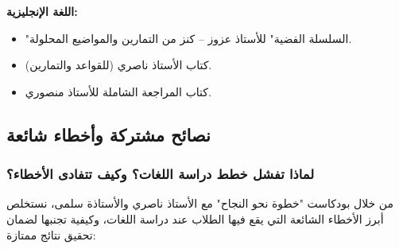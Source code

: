 \documentclass[12pt,a4paper]{book}
\begin{document}
	\textbf{اللغة الإنجليزية:}
	\begin{itemize}
		\item "السلسلة الفضية" للأستاذ عزوز – كنز من التمارين والمواضيع المحلولة.
		\item كتاب الأستاذ ناصري (للقواعد والتمارين).
		\item كتاب المراجعة الشاملة للأستاذ منصوري.
	\end{itemize}
	
	
	
	\subsection{نصائح مشتركة وأخطاء شائعة}
	\label{sec:random-tips11}
	
	\subsubsection{لماذا تفشل خطط دراسة اللغات؟ وكيف تتفادى الأخطاء؟}
	
	من خلال بودكاست "خطوة نحو النجاح" مع الأستاذ ناصري والأستاذة سلمى، نستخلص أبرز الأخطاء الشائعة التي يقع فيها الطلاب عند دراسة اللغات، وكيفية تجنبها لضمان تحقيق نتائج ممتازة:
	
\end{document}
